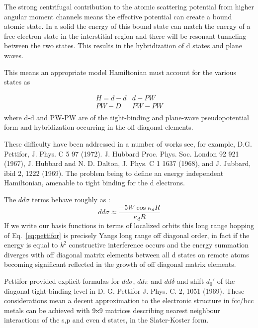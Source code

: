 \documentclass{article}
\begin{document}
The strong centrifugal contribution to the
atomic scattering potential from higher angular moment channels means the effective potential
can create a bound atomic state. In a solid the energy of this bound state can match the 
energy of a free electron state in the interstitial region and there will
be resonant tunneling between the two states. This results in the hybridization of d states
and plane waves. 

This means an appropriate model Hamiltonian must account for the various states as

\begin{eqnarray}
\label{eq:d-hamiltonian}
H = d-d  & d-PW \\
    PW-D & PW-PW \\
\end{eqnarray}
where d-d and PW-PW are of the tight-binding and plane-wave 
pseudopotential form and hybridization occurring in the 
off diagonal elements. 

These difficulty have been addressed in a number of works 
see, for example, D.G. Pettifor, J. Phys. C 5 97 (1972).
J. Hubbard Proc. Phys. Soc. London 92 921 (1967),
J. Hubbard and N. D. Dalton, J. Phys. C 1 1637 (1968),
and J. Jubbard, ibid 2, 1222 (1969). The problem being to define an
energy independent Hamiltonian, amenable to tight binding for the d electrons.

The $dd\sigma$ terms behave roughly as \cite{pettifor71}:
%
\begin{equation}
\label{eq:pettifor}
dd\sigma \approx \frac{-5W\cos\kappa_{d}R}{\kappa_{d}R}
\end{equation}
%
If we write our basis functions in terms of localized orbits this long range hopping of
Eq.~\ref{eq:pettifor} is  precisely Yangs long range off diagonal order, in fact if 
the energy is equal to $k^{2}$ constructive interference occurs and the energy summation
diverges with off diagonal matrix elements between all d states on remote atoms becoming
significant reflected in the growth of off diagonal matrix elements.


Pettifor provided explicit formulas for $dd\sigma$, $dd\pi$ and $dd\delta$ and 
shift $d_{0}'$ of the diagonal tight-binding level in D. G. Pettifor J. Phys. C. 2, 1051 (1969).
%
These considerations mean a decent approximation to the electronic structure in fcc/bcc metals
can be achieved with 9x9 matrices describing nearest neighbour interactions of the s,p and even d states,
in the Slater-Koster form.

\scriptsize


\end{document}
